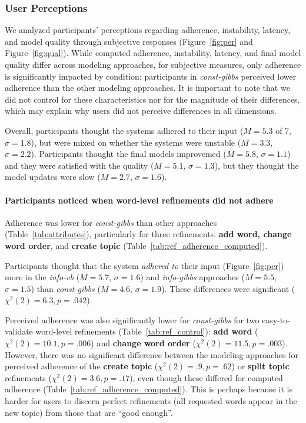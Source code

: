 \subsubsection{User Perceptions}
We analyzed participants' perceptions regarding adherence, instability, latency, and model quality through subjective responses (Figure~\ref{fig:per} and Figure~\ref{fig:qual}). 
While computed adherence, instability, latency, and final model quality differ across modeling approaches, for subjective measures, only adherence is significantly impacted by condition: participants in \textit{const-gibbs} perceived lower adherence than the other modeling approaches.
It is important to note that we did not control for these characteristics nor for the magnitude of their differences, which may explain why users did not perceive differences in all dimensions.

Overall, participants thought the systems adhered to their input
($M=5.3$ of 7, $\sigma=1.8$), but were mixed on whether the systems
were unstable ($M=3.3$, $\sigma=2.2$). Participants thought
the final models improvemed ($M=5.8$, $\sigma=1.1$) and they
were satisfied with the quality ($M=5.1$, $\sigma=1.3$), but they
thought the model updates were slow ($M=2.7$, $\sigma=1.6$).

\paragraph{Participants noticed when word-level refinements did not adhere}
\label{sec:control}

Adherence was lower for \textit{const-gibbs} than other approaches
(Table~\ref{tab:attributes}), particularly for three refinements:
\textbf{add word, change word order}, and \textbf{create topic}
(Table~\ref{tab:ref_adherence_computed}).

Participants thought that the system \textit{adhered to} their input
(Figure~\ref{fig:per}) more in the \textit{info-vb} ($M=5.7$,
$\sigma=1.6$) and \textit{info-gibbs} approaches ($M=5.5$,
$\sigma=1.5$) than \textit{const-gibbs} ($M=4.6$, $\sigma=1.9$).
These differences were significant (${\chi}^2(2)=6.3,
p=.042$).

Perceived adherence was also significantly lower for
\textit{const-gibbs} for two easy-to-validate word-level refinements
(Table~\ref{tab:ref_control}): \textbf{add word} (${\chi}^2(2)=10.1,
p=.006$) and \textbf{change word order} (${\chi}^2(2)=11.5, p=.003$).
However, there was no significant difference between the modeling
approaches for perceived adherence of the \textbf{create topic}
(${\chi}^2(2)=.9, p=.62$) or \textbf{split topic} refinements
(${\chi}^2(2)=3.6, p=.17$), even though these differed for computed
adherence (Table~\ref{tab:ref_adherence_computed}).  This is perhaps because
it is harder for users to discern perfect refinements (all requested
words appear in the new topic) from those that are ``good enough''.

